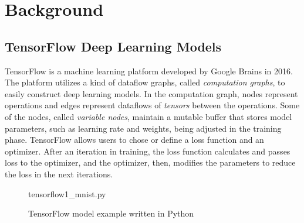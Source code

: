 \section{Background}\label{sec:background}
\subsection{TensorFlow Deep Learning Models}

TensorFlow\cite{tensorflow} is a machine learning platform developed by Google
Brains in 2016.
The platform utilizes a kind of dataflow graphs, called {\it computation
graphs}, to easily construct deep learning models.
In the computation graph, nodes represent operations and edges represent
dataflows of {\it tensors} between the operations.
Some of the nodes, called {\it variable nodes}, maintain a mutable buffer that
stores model parameters, such as learning rate and weights, being adjusted in
the training phase.
TensorFlow allows users to chose or define a loss function and an optimizer.
After an iteration in training, the loss function calculates and passes loss to
the optimizer, and the optimizer, then, modifies the parameters to reduce the
loss in the next iterations.

\begin{figure}[ht!]

{tensorflow1_mnist.py}
  \caption{TensorFlow model example written in Python}
\label{fig:back:tf1}
\end{figure}

